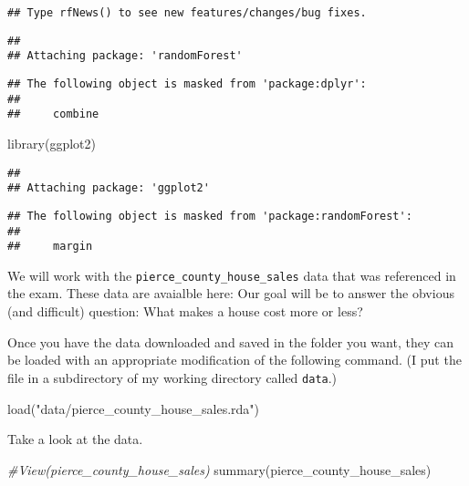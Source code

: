 \documentclass[
]{article}
\newenvironment{Shaded}{\begin{snugshade}}{\end{snugshade}}
\newcommand{\CommentTok}[1]{\textcolor[rgb]{0.56,0.35,0.01}{\textit{#1}}}
\newcommand{\FunctionTok}[1]{\textcolor[rgb]{0.00,0.00,0.00}{#1}}
\newcommand{\NormalTok}[1]{#1}
\newcommand{\StringTok}[1]{\textcolor[rgb]{0.31,0.60,0.02}{#1}}
\begin{document}
\begin{verbatim}
## Type rfNews() to see new features/changes/bug fixes.
\end{verbatim}

\begin{verbatim}
## 
## Attaching package: 'randomForest'
\end{verbatim}

\begin{verbatim}
## The following object is masked from 'package:dplyr':
## 
##     combine
\end{verbatim}

\begin{Shaded}
\begin{Highlighting}[]
\FunctionTok{library}\NormalTok{(ggplot2)}
\end{Highlighting}
\end{Shaded}

\begin{verbatim}
## 
## Attaching package: 'ggplot2'
\end{verbatim}

\begin{verbatim}
## The following object is masked from 'package:randomForest':
## 
##     margin
\end{verbatim}

We will work with the \texttt{pierce\_county\_house\_sales} data that
was referenced in the exam. These data are avaialble here: Our goal will
be to answer the obvious (and difficult) question: What makes a house
cost more or less?

Once you have the data downloaded and saved in the folder you want, they
can be loaded with an appropriate modification of the following command.
(I put the file in a subdirectory of my working directory called
\texttt{data}.)

\begin{Shaded}
\begin{Highlighting}[]
\FunctionTok{load}\NormalTok{(}\StringTok{"data/pierce\_county\_house\_sales.rda"}\NormalTok{)}
\end{Highlighting}
\end{Shaded}

Take a look at the data.

\begin{Shaded}
\begin{Highlighting}[]
\CommentTok{\#View(pierce\_county\_house\_sales)}
\FunctionTok{summary}\NormalTok{(pierce\_county\_house\_sales)}
\end{Highlighting}
\end{Shaded}
\end{document}
